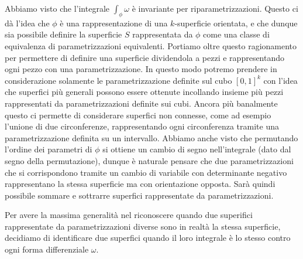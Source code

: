 Abbiamo visto che l'integrale $\int_\phi \omega$ è invariante per riparametrizzazioni. 
Questo ci dà l'idea che $\phi$ è una rappresentazione di una $k$-superficie orientata, 
e che dunque sia possibile definire la superficie $S$ rappresentata da $\phi$ come 
una classe di equivalenza di parametrizzazioni equivalenti. 
Portiamo oltre questo ragionamento per permettere di definire una superficie 
dividendola a pezzi e rappresentando ogni pezzo con una parametrizzazione. 
In questo modo potremo prendere in considerazione solamente le parametrizzazione 
definite sul cubo $[0,1]^k$ con l'idea che superfici più generali possono essere 
ottenute incollando insieme più pezzi rappresentati da parametrizzazioni definite sui cubi.
Ancora più banalmente questo ci permette di considerare superfici non connesse,  
come ad esempio l'unione di due circonferenze, 
rappresentando ogni circonferenza tramite una parametrizzazione definita su un intervallo.
Abbiamo anche visto che permutando l'ordine dei parametri di $\phi$ 
si ottiene un cambio di segno nell'integrale (dato dal segno della permutazione), 
dunque è naturale pensare che due parametrizzazioni che si corrispondono tramite 
un cambio di variabile con determinante negativo rappresentano 
la stessa superficie ma con orientazione opposta.
Sarà quindi possibile sommare e sottrarre superfici rappresentate da parametrizzazioni.

Per avere la massima generalità nel riconoscere quando due superifici rappresentate da 
parametrizzazioni diverse sono in realtà la stessa superficie, decidiamo 
di identificare due superfici quando il loro integrale è lo stesso contro ogni forma differenziale $\omega$.

